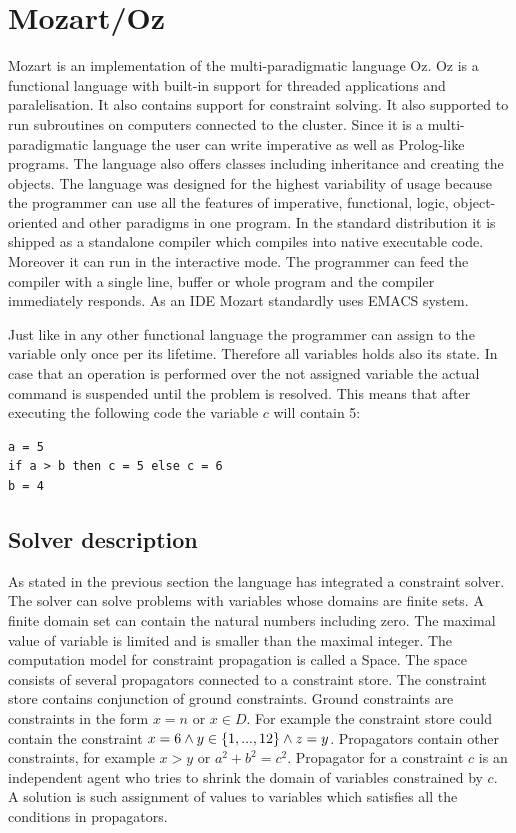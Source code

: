 \section{Mozart/Oz}

Mozart is an implementation of the multi-paradigmatic language Oz. Oz is a functional
language with built-in support for threaded applications and paralelisation. It also
contains support for constraint solving. It also supported to run subroutines on computers
connected to the cluster. Since it is a multi-paradigmatic language the user
can write imperative as well as Prolog-like programs. The language also offers classes
including inheritance and creating the objects. The language was designed for the
highest variability of usage because the programmer can use all the features of imperative,
functional, logic, object-oriented and other paradigms in one program. In the standard distribution
it is shipped as a standalone compiler which compiles into native executable code.
Moreover it can run in the interactive mode. The programmer can feed the compiler with
a single line, buffer or whole program and the compiler immediately responds. As an IDE
Mozart standardly uses EMACS system.

Just like in any other functional language the programmer can assign to the variable 
only once per its lifetime. Therefore all variables holds also its state. In case that
an operation is performed over the not assigned variable the actual command is suspended
until the problem is resolved. This means that after executing the following code the
variable $c$ will contain 5:

\begin{verbatim}
a = 5
if a > b then c = 5 else c = 6
b = 4
\end{verbatim}

\subsection{Solver description}
As stated in the previous section the language has integrated a constraint solver. The solver
can solve problems with variables whose domains are finite sets. A finite domain
set can contain the natural numbers including zero. The maximal value of variable is limited and is smaller 
than the maximal integer. The computation model for constraint propagation is called 
a Space. The space consists of several propagators connected to a constraint store.
The constraint store contains conjunction of ground constraints. Ground constraints
are constraints in the form $x=n$ or $x \in D$. For example the constraint store could
contain the constraint $x = 6 \wedge y \in \{1, ..., 12\} \wedge z = y$. Propagators contain
other constraints, for example $x>y$ or $a^2 + b^2 = c^2$. Propagator for a constraint
 $c$ is an independent agent who tries to shrink the domain of variables constrained
 by $c$. A solution is such  assignment of values to variables which satisfies all the conditions
 in propagators.
 
